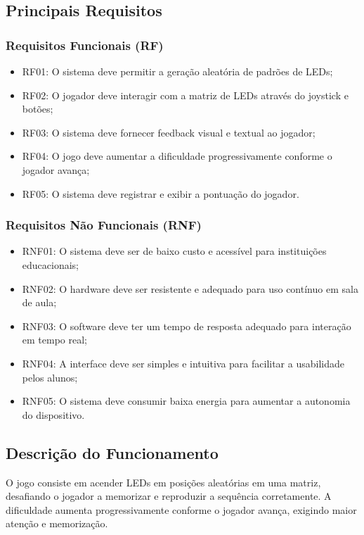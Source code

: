 \subsection{Principais Requisitos}
\subsubsection{Requisitos Funcionais (RF)}
\begin{itemize}
\item RF01: O sistema deve permitir a geração aleatória de padrões de LEDs;
\item RF02: O jogador deve interagir com a matriz de LEDs através do joystick e botões;
\item RF03: O sistema deve fornecer feedback visual e textual ao jogador;
\item RF04: O jogo deve aumentar a dificuldade progressivamente conforme o jogador avança;
\item RF05: O sistema deve registrar e exibir a pontuação do jogador.
\end{itemize}

\subsubsection{Requisitos Não Funcionais (RNF)}
\begin{itemize}
\item RNF01: O sistema deve ser de baixo custo e acessível para instituições educacionais;
\item RNF02: O hardware deve ser resistente e adequado para uso contínuo em sala de aula;
\item RNF03: O software deve ter um tempo de resposta adequado para interação em tempo real;
\item RNF04: A interface deve ser simples e intuitiva para facilitar a usabilidade pelos alunos;
\item RNF05: O sistema deve consumir baixa energia para aumentar a autonomia do dispositivo.
\end{itemize}

\subsection{Descrição do Funcionamento}
O jogo consiste em acender LEDs em posições aleatórias em uma matriz, desafiando o jogador a memorizar e reproduzir a sequência corretamente. A dificuldade aumenta progressivamente conforme o jogador avança, exigindo maior atenção e memorização.

